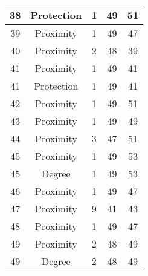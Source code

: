 \documentclass[results.tex]{subfiles}
\begin{document}
\begin{center}
\begin{tabular}{| c || c | c | c | c |}
            \hline
            38                      & Protection                   & 1                      & 49                      & 51                   \\
            \hline
            39                      & Proximity                    & 1                      & 49                      & 47                   \\
            \hline
            40                      & Proximity                    & 2                      & 48                      & 39                   \\
            \hline
            41                      & Proximity                    & 1                      & 49                      & 41                   \\
            \hline
            41                      & Protection                   & 1                      & 49                      & 41                   \\
            \hline
            42                      & Proximity                    & 1                      & 49                      & 51                   \\
            \hline
            43                      & Proximity                    & 1                      & 49                      & 49                   \\
            \hline
            44                      & Proximity                    & 3                      & 47                      & 51                   \\
            \hline
            45                      & Proximity                    & 1                      & 49                      & 53                   \\
            \hline
            45                      & Degree                       & 1                      & 49                      & 53                   \\
            \hline
            46                      & Proximity                    & 1                      & 49                      & 47                   \\
            \hline
            47                      & Proximity                    & 9                      & 41                      & 43                   \\
            \hline
            48                      & Proximity                    & 1                      & 49                      & 47                   \\
            \hline
            49                      & Proximity                    & 2                      & 48                      & 49                   \\
            \hline
            49                      & Degree                       & 2                      & 48                      & 49                   \\
            \hline
        \end{tabular}
    \end{center}
\end{document}
